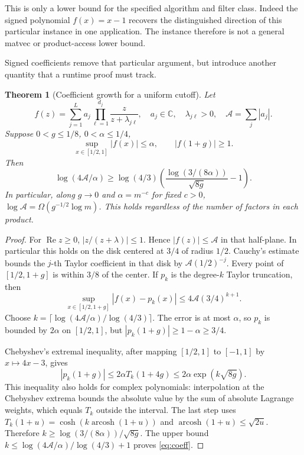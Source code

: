 \documentclass[11pt]{article}
\newtheorem{theorem}{Theorem}
\theoremstyle{remark}
\newcommand{\C}{\mathbb C}
\begin{document}
This is only a lower bound for the specified algorithm and filter class.
Indeed the signed polynomial \(f(x)=x-1\) recovers the distinguished
direction of this particular instance in one application. The instance
therefore is not a general matvec or product-access lower bound.

Signed coefficients remove that particular argument, but introduce another
quantity that a runtime proof must track.

\begin{theorem}[Coefficient growth for a uniform cutoff]\label{thm:coeff}
Let
\[
 f(z)=\sum_{j=1}^L a_j\prod_{\ell=1}^{d_j}
                         \frac{z}{z+\lambda_{j\ell}},
 \quad a_j\in\C,\quad\lambda_{j\ell}>0,\quad
 \mathcal A=\sum_j|a_j|.
\]
Suppose \(0<g\leq1/8\), \(0<\alpha\leq1/4\),
\[
 \sup_{x\in[1/2,1]}|f(x)|\leq\alpha,
 \qquad |f(1+g)|\geq1.
\]
Then
\begin{equation}\label{eq:coeff}
 \log(4\mathcal A/\alpha)
 \geq\log(4/3)\left(
       \frac{\log(3/(8\alpha))}{\sqrt{8g}}-1\right).
\end{equation}
In particular, along \(g\to0\) and \(\alpha=m^{-c}\) for fixed
\(c>0\), \(\log\mathcal A=\Omega(g^{-1/2}\log m)\).
This holds regardless of the number of factors in each product.
\end{theorem}
\begin{proof}
For \(\operatorname{Re}z\geq0\),
\(|z/(z+\lambda)|\leq1\). Hence \(|f(z)|\leq\mathcal A\) in
that half-plane. In particular this holds on the disk centered at \(3/4\)
of radius \(1/2\). Cauchy's estimate bounds the \(j\)-th Taylor
coefficient in that disk by \(\mathcal A(1/2)^{-j}\).
Every point of \([1/2,1+g]\) is within \(3/8\) of the center.
If \(p_k\) is the degree-\(k\) Taylor truncation, then
\[
 \sup_{x\in[1/2,1+g]}|f(x)-p_k(x)|
 \leq4\mathcal A(3/4)^{k+1}.
\]
Choose \(k=\lceil\log(4\mathcal A/\alpha)/\log(4/3)\rceil\).
The error is at most \(\alpha\), so \(p_k\) is bounded by
\(2\alpha\) on \([1/2,1]\), but
\(|p_k(1+g)|\geq1-\alpha\geq3/4\).

Chebyshev's extremal inequality, after mapping \([1/2,1]\) to
\([-1,1]\) by \(x\mapsto4x-3\), gives
\[
 |p_k(1+g)|\leq2\alpha T_k(1+4g)
 \leq2\alpha\exp(k\sqrt{8g}).
\]
This inequality also holds for complex polynomials: interpolation at the
Chebyshev extrema bounds the absolute value by the sum of absolute Lagrange
weights, which equals \(T_k\) outside the interval. The last step uses
\(T_k(1+u)=\cosh(k\operatorname{arcosh}(1+u))\) and
\(\operatorname{arcosh}(1+u)\leq\sqrt{2u}\).
Therefore \(k\geq\log(3/(8\alpha))/\sqrt{8g}\).
The upper bound \(k\leq\log(4\mathcal A/\alpha)/\log(4/3)+1\)
proves \eqref{eq:coeff}.
\end{proof}
\end{document}
